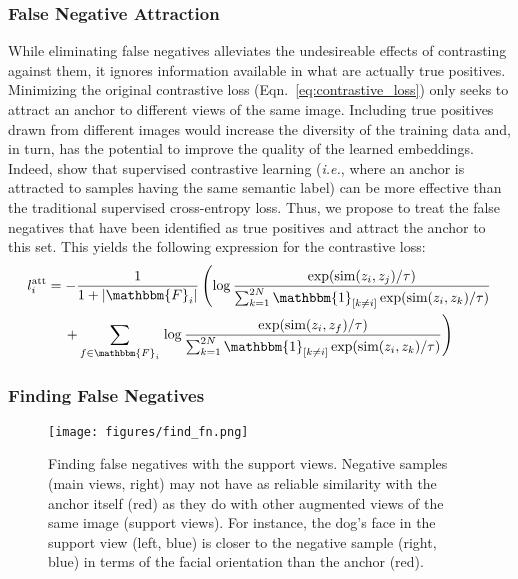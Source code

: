 \documentclass[10pt,twocolumn,letterpaper]{article}
\begin{document}
\subsubsection{False Negative Attraction}
While eliminating false negatives alleviates the undesireable effects of contrasting against them, it ignores information available in what are actually true positives. Minimizing the original contrastive loss (Eqn.~\ref{eq:contrastive_loss}) only seeks to attract an anchor to different views of the same image. Including true positives drawn from different images would increase the diversity of the training data and, in turn, has the potential to improve the quality of the learned embeddings. Indeed, \citet{khosla2020supervised} show that supervised contrastive learning (\emph{i.e.}, where an anchor is attracted to samples having the same semantic label) can be more effective than the traditional supervised cross-entropy loss. Thus, we propose to treat the false negatives that have been identified as true positives and attract the anchor to this set. This yields the following expression for the contrastive loss:
\begin{multline}
l_{i}^\textrm{att}= - \frac{1}{1+\lvert \mathbbm{F}_i \rvert} \left( \log\frac{\exp(\textrm{sim}(z_i,z_j)/\tau)}{\sum_{k=1}^{2N} \mathbbm{1}_{[k\ne i]}\exp(\textrm{sim}(z_i,z_k)/\tau)} \right.\\
               + \sum_{f\in \mathbbm{F}_i} \left. \log\frac{\exp(\textrm{sim}(z_i,z_f)/\tau)}{\sum_{k=1}^{2N} \mathbbm{1}_{[k\ne i]}\exp(\textrm{sim}(z_i,z_k)/\tau)} \right)
\end{multline}




\subsubsection{Finding False Negatives} \label{sec:find_fn}

\begin{figure}[t]
\begin{center}
    \texttt{[image: figures/find\_fn.png]}
    \caption{Finding false negatives with the support views. Negative samples (main views, right) may not have as reliable similarity with the anchor itself (red) as they do with other augmented views of the same image (support views). For instance, the dog's face in the support view (left, blue) is closer to the negative sample (right, blue) in terms of the facial orientation than the anchor (red).}\label{fig:find_fn}
\end{center}
\vspace{-10pt}
\end{figure}
\end{document}
